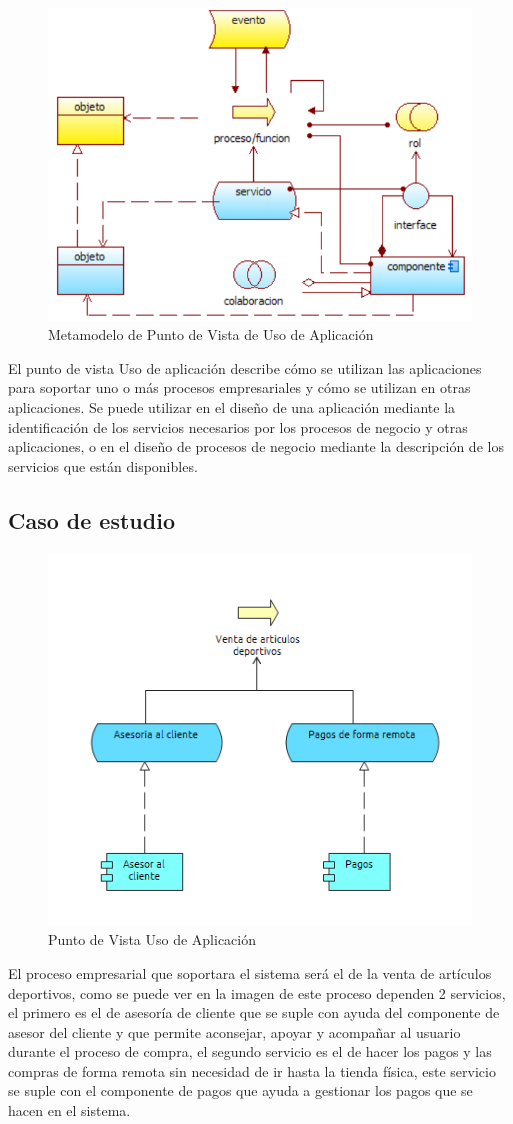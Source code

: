 \begin{figure}[th!]
	\centering
	\includegraphics[width=0.5\linewidth]{arquitectura/imagenes/modeloUsoAplicacion}
	\caption{Metamodelo de Punto de Vista de Uso de Aplicación \cite{pun10}}
	\label{fig:metamodelo de punto de vista de uso de aplicación}
\end{figure}
El punto de vista Uso de aplicación describe cómo se utilizan las aplicaciones para soportar uno o más procesos empresariales y cómo se utilizan en otras aplicaciones. Se puede utilizar en el diseño de una aplicación mediante la identificación de los servicios necesarios por los procesos de negocio y otras aplicaciones, o en el diseño de procesos de negocio mediante la descripción de los servicios que están disponibles.

\subsection{Caso de estudio}
\begin{figure}[th!]
	\centering
	\includegraphics[width=0.5\linewidth]{arquitectura/imagenes/PuntoVistaUsoAplicacion}
	\caption{Punto de Vista Uso de Aplicación}
	\label{fig:vistaUsoaplicacion}
\end{figure}

El proceso empresarial que soportara el sistema será el de la venta de artículos deportivos, como se puede ver en la imagen de este proceso dependen 2 servicios, el primero es el de asesoría de cliente que se suple con ayuda del componente de asesor del cliente y que permite aconsejar, apoyar y acompañar al usuario durante el proceso de compra, el segundo servicio es el de hacer los pagos y las compras de forma remota sin necesidad de ir hasta la tienda física, este servicio se suple con el componente de pagos que ayuda a gestionar los pagos que se hacen en el sistema.

\newpage
